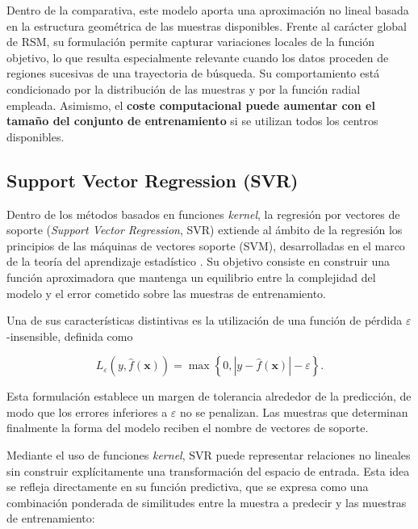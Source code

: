 Dentro de la comparativa, este modelo aporta una aproximación no lineal basada en la estructura geométrica de las muestras disponibles. Frente al carácter global de RSM, su formulación permite capturar variaciones locales de la función objetivo, lo que resulta especialmente relevante cuando los datos proceden de regiones sucesivas de una trayectoria de búsqueda. Su comportamiento está condicionado por la distribución de las muestras y por la función radial empleada. Asimismo, el \textbf{coste computacional puede aumentar con el tamaño del conjunto de entrenamiento} si se utilizan todos los centros disponibles.

\subsection{Support Vector Regression (SVR)}

Dentro de los métodos basados en funciones \textit{kernel}, la regresión por vectores de soporte (\textit{Support Vector Regression}, SVR) extiende al ámbito de la regresión los principios de las máquinas de vectores soporte (SVM), desarrolladas en el marco de la teoría del aprendizaje estadístico \cite{smola2004tutorial}. Su objetivo consiste en construir una función aproximadora que mantenga un equilibrio entre la complejidad del modelo y el error cometido sobre las muestras de entrenamiento.

Una de sus características distintivas es la utilización de una función de pérdida \(\varepsilon\)-insensible, definida como

\begin{equation}
    L_{\varepsilon}
    \left(
    y,
    \hat{f}(\mathbf{x})
    \right)
    =
    \max
    \left\{
    0,
    \left|
    y - \hat{f}(\mathbf{x})
    \right|
    -
    \varepsilon
    \right\}.
\end{equation}

Esta formulación establece un margen de tolerancia alrededor de la predicción, de modo que los errores inferiores a \(\varepsilon\) no se penalizan. Las muestras que determinan finalmente la forma del modelo reciben el nombre de vectores de soporte.

Mediante el uso de funciones \textit{kernel}, SVR puede representar relaciones no lineales sin construir explícitamente una transformación del espacio de entrada. Esta idea se refleja directamente en su función predictiva, que se expresa como una combinación ponderada de similitudes entre la muestra a predecir y las muestras de entrenamiento:

